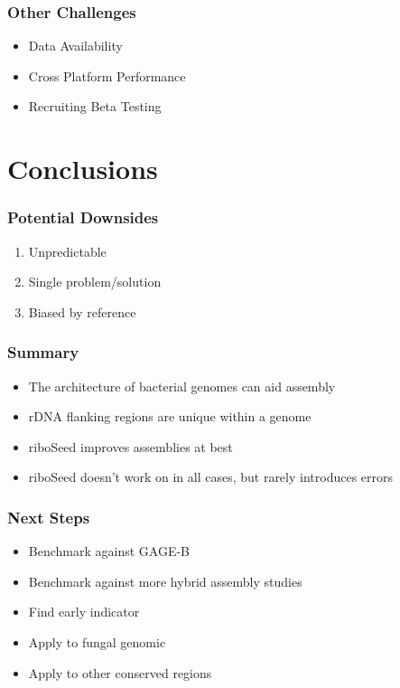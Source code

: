 \documentclass[10pt, compress]{beamer}
\begin{document}
\begin{frame}[fragile]
  \frametitle{Other Challenges}
\begin{itemize}
\item Data Availability
\item Cross Platform Performance
\item Recruiting Beta Testing
\end{itemize}
\end{frame}




\section{Conclusions}
 \begin{frame}[fragile]
  \frametitle{Potential Downsides}
\begin{enumerate}
  \item Unpredictable
  \item Single problem/solution
  \item Biased by reference
\end{enumerate}
\end{frame}

 \begin{frame}[fragile]
  \frametitle{Summary}
  \begin{itemize}[<+- | alert@+>]
  \item The architecture of bacterial genomes can aid assembly
  \item rDNA flanking regions are unique within a genome
  \item riboSeed improves assemblies at best
  \item riboSeed doesn't work on in all cases, but rarely introduces errors
  \end{itemize}
\end{frame}

\begin{frame}[fragile]
  \frametitle{Next Steps}
  \begin{itemize}
  \item Benchmark against GAGE-B
  \item Benchmark against more hybrid assembly studies
  \item Find early indicator
  \item Apply to fungal genomic
  \item Apply to other conserved regions
  \end{itemize}
\end{frame}
\end{document}
